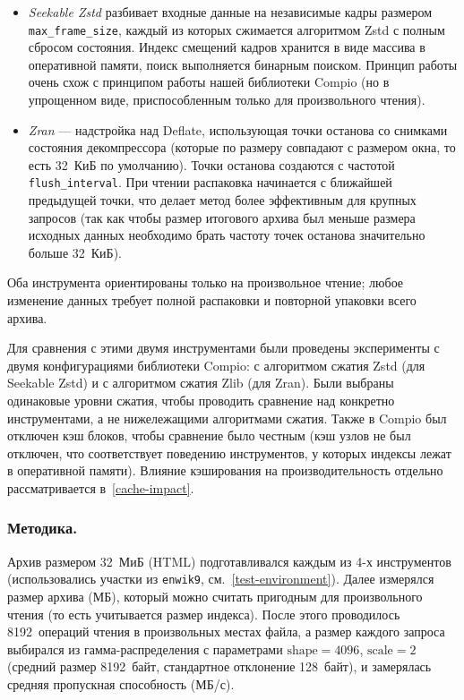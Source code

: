 \begin{itemize}
    \item \textit{Seekable Zstd} разбивает входные данные на независимые кадры размером \texttt{max\_frame\_size}, каждый из которых сжимается алгоритмом Zstd с полным сбросом состояния. Индекс смещений кадров хранится в виде массива в оперативной памяти, поиск выполняется бинарным поиском. Принцип работы очень схож с принципом работы нашей библиотеки Compio (но в упрощенном виде, приспособленным только для произвольного чтения).
    \item \textit{Zran} --- надстройка над Deflate, использующая точки останова со снимками состояния декомпрессора (которые по размеру совпадают с размером окна, то есть 32~КиБ по умолчанию). Точки останова создаются с частотой \texttt{flush\_interval}. При чтении распаковка начинается с ближайшей предыдущей точки, что делает метод более эффективным для крупных запросов (так как чтобы размер итогового архива был меньше размера исходных данных необходимо брать частоту точек останова значительно больше 32~КиБ).
\end{itemize}

Оба инструмента ориентированы только на произвольное чтение; любое изменение данных требует полной распаковки и повторной упаковки всего архива.

Для сравнения с этими двумя инструментами были проведены эксперименты с двумя конфигурациями библиотеки Compio: с алгоритмом сжатия Zstd (для Seekable Zstd) и с алгоритмом сжатия Zlib (для Zran). Были выбраны одинаковые уровни сжатия, чтобы проводить сравнение над конкретно инструментами, а не нижележащими алгоритмами сжатия. Также в Compio был отключен кэш блоков, чтобы сравнение было честным (кэш узлов не был отключен, что соответствует поведению инструментов, у которых индексы лежат в оперативной памяти). Влияние кэширования на производительность отдельно рассматривается в~\ref{cache-impact}.

\subsubsection{Методика.}
Архив размером 32~МиБ (HTML) подготавливался каждым из 4-х инструментов (использовались участки из \texttt{enwik9}, см.~\ref{test-environment}). Далее измерялся размер архива (МБ), который можно считать пригодным для произвольного чтения (то есть учитывается размер индекса). После этого проводилось 8192~операций чтения в произвольных местах файла, а размер каждого запроса выбирался из гамма-распределения с параметрами $\mathrm{shape}=4096$, $\mathrm{scale}=2$ (средний размер 8192~байт, стандартное отклонение 128~байт), и замерялась средняя пропускная способность (МБ/с).

